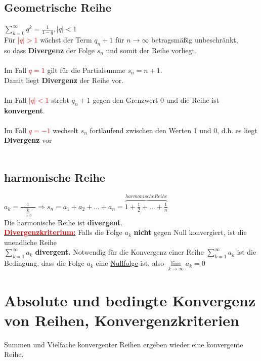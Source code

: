 \documentclass[12pt,a4paper]{article}
\begin{document}
\subsection{Geometrische Reihe}
$\sum\limits_{k=0}^{\infty}q^k=\frac{1}{1-q},|q|<1$
\\
Für \textcolor{red}{$|q|>1$} wächst der Term $q_n+1$ für $n\rightarrow\infty$ betragsmäßig unbeschränkt,\\ so dass \textbf{Divergenz} der Folge $s_n$ und somit der Reihe vorliegt.
\\
\\
Im Fall \textcolor{red}{$q=1$} gilt für die Partialsumme $s_n=n+1$.\\Damit liegt \textbf{Divergenz} der Reihe vor.
\\
\\
Im Fall \textcolor{red}{$|q|<1$} strebt $q_n+1$ gegen den Grenzwert 0 und die Reihe ist \textbf{konvergent}.
\\
\\
Im Fall \textcolor{red}{$q=-1$} wechselt $s_n$ fortlaufend zwischen den Werten 1 und 0, d.h. es liegt \textbf{Divergenz} vor
\\
\\
\subsection{harmonische Reihe}
$a_k=\frac{1}{\phantom{...}\underbrace{k}_{>0}\phantom{...}}\Rightarrow s_n=a_1+a_2+...+a_n=\overbrace{1+\frac{1}{2}+...+\frac{1}{n}}^{harmonische Reihe}$\\
Die harmonische Reihe ist \textbf{divergent}.
\\\underline{\textbf{\textcolor{red}{Divergenzkriterium:}}}
Falls die Folge $a_k$ \textbf{nicht} gegen Null konvergiert, ist die
unendliche Reihe\\ 
$\sum\limits_{k=1}^{\infty}a_k$ \textbf{divergent.}
Notwendig für die Konvergenz einer Reihe $\sum\limits_{k=1}^{\infty}a_k$ ist die Bedingung, dass die Folge $a_k$
eine \underline{Nullfolge} ist, also $\lim\limits_{k\rightarrow\infty}a_k=0$
\section{Absolute und bedingte Konvergenz von Reihen, Konvergenzkriterien}
Summen und Vielfache konvergenter Reihen ergeben wieder eine konvergente Reihe.
\end{document}
